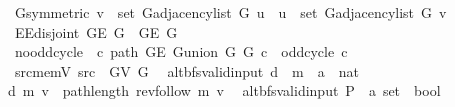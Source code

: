 \begin{isabellebody}
\ \ \ G{}{\isacharunderscore}{\kern0pt}symmetric{\isacharcolon}{\kern0pt}\ {\isachardoublequoteopen}v\ {\isasymin}\ set\ {\isacharparenleft}{\kern0pt}G{\isachardot}{\kern0pt}adjacency{\isacharunderscore}{\kern0pt}list\ G{}\ u{\isacharparenright}{\kern0pt}\ {\isasymlongleftrightarrow}\ u\ {\isasymin}\ set\ {\isacharparenleft}{\kern0pt}G{\isachardot}{\kern0pt}adjacency{\isacharunderscore}{\kern0pt}list\ G{}\ v{\isacharparenright}{\kern0pt}{\isachardoublequoteclose}\isanewline
\ \ \ E{}{\isacharunderscore}{\kern0pt}E{}{\isacharunderscore}{\kern0pt}disjoint{\isacharcolon}{\kern0pt}\ {\isachardoublequoteopen}G{\isachardot}{\kern0pt}E\ G{}\ {\isasyminter}\ G{\isachardot}{\kern0pt}E\ G{}\ {\isacharequal}{\kern0pt}\ {\isacharbraceleft}{\kern0pt}{\isacharbraceright}{\kern0pt}{\isachardoublequoteclose}\isanewline
\ \ \ no{\isacharunderscore}{\kern0pt}odd{\isacharunderscore}{\kern0pt}cycle{\isacharcolon}{\kern0pt}\ {\isachardoublequoteopen}{\isasymnot}\ {\isacharparenleft}{\kern0pt}{\isasymexists}c{\isachardot}{\kern0pt}\ path\ {\isacharparenleft}{\kern0pt}G{\isachardot}{\kern0pt}E\ {\isacharparenleft}{\kern0pt}G{\isachardot}{\kern0pt}union\ G{}\ G{}{\isacharparenright}{\kern0pt}{\isacharparenright}{\kern0pt}\ c\ {\isasymand}\ odd{\isacharunderscore}{\kern0pt}cycle\ c{\isacharparenright}{\kern0pt}{\isachardoublequoteclose}\isanewline
\ \ \ src{\isacharunderscore}{\kern0pt}mem{\isacharunderscore}{\kern0pt}V{}{\isacharcolon}{\kern0pt}\ {\isachardoublequoteopen}src\ {\isasymin}\ G{\isachardot}{\kern0pt}V\ G{}{\isachardoublequoteclose}\isanewline
\isanewline
{}\isamarkupfalse%
\ {\isacharparenleft}{\kern0pt}\ alt{\isacharunderscore}{\kern0pt}bfs{\isacharunderscore}{\kern0pt}valid{\isacharunderscore}{\kern0pt}input{\isacharparenright}{\kern0pt}\ d\ {\isacharcolon}{\kern0pt}{\isacharcolon}{\kern0pt}\ {\isachardoublequoteopen}{\isacharprime}{\kern0pt}m\ {\isasymRightarrow}\ {\isacharprime}{\kern0pt}a\ {\isasymRightarrow}\ nat{\isachardoublequoteclose}\ \isanewline
\ \ {\isachardoublequoteopen}d\ m\ v\ {\isasymequiv}\ path{\isacharunderscore}{\kern0pt}length\ {\isacharparenleft}{\kern0pt}rev{\isacharunderscore}{\kern0pt}follow\ m\ v{\isacharparenright}{\kern0pt}{\isachardoublequoteclose}\isanewline
\isanewline
{}\isamarkupfalse%
\ {\isacharparenleft}{\kern0pt}\ alt{\isacharunderscore}{\kern0pt}bfs{\isacharunderscore}{\kern0pt}valid{\isacharunderscore}{\kern0pt}input{\isacharparenright}{\kern0pt}\ P{\isacharprime}{\kern0pt}{\isacharprime}{\kern0pt}\ {\isacharcolon}{\kern0pt}{\isacharcolon}{\kern0pt}\ {\isachardoublequoteopen}{\isacharprime}{\kern0pt}a\ set\ {\isasymRightarrow}\ bool{\isachardoublequoteclose}\ \isanewline

\end{isabellebody}
